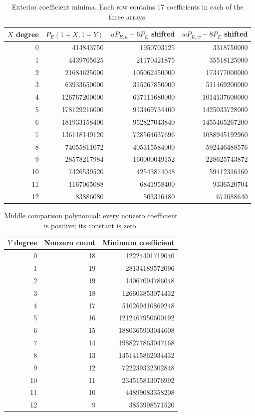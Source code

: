\begin{table}[htbp]
\centering\scriptsize
\caption{Exterior coefficient minima. Each row contains 17 coefficients in each of the three arrays.}\label{tab:E}
\begin{tabular}{r r r r}
\toprule
$X$ degree & $P_E(1+X,1+Y)$ & $uP_{E,u}-6P_E$ shifted & $wP_{E,w}-8P_E$ shifted\\
\midrule
0 & 414843750 & 1950703125 & 3318750000\\
1 & 4439765625 & 21170421875 & 35518125000\\
2 & 21684625000 & 105062450000 & 173477000000\\
3 & 63933650000 & 315267850000 & 511469200000\\
4 & 126767200000 & 637111680000 & 1014137600000\\
5 & 178129216000 & 913469734400 & 1425033728000\\
6 & 181933158400 & 952827043840 & 1455465267200\\
7 & 136118149120 & 728564637696 & 1088945192960\\
8 & 74055811072 & 405315584000 & 592446488576\\
9 & 28578217984 & 160000049152 & 228625743872\\
10 & 7426539520 & 42543874048 & 59412316160\\
11 & 1167065088 & 6841958400 & 9336520704\\
12 & 83886080 & 503316480 & 671088640\\
\bottomrule
\end{tabular}
\end{table}
\begin{table}[htbp]
\centering\small
\caption{Middle comparison polynomial: every nonzero coefficient is positive; its constant is zero.}\label{tab:M}
\begin{tabular}{r r r}
\toprule
$Y$ degree & Nonzero count & Minimum coefficient\\
\midrule
0 & 18 & 12224401719040\\
1 & 19 & 28134189572096\\
2 & 19 & 14067094786048\\
3 & 18 & 126603853074432\\
4 & 17 & 510269410869248\\
5 & 16 & 1212467950600192\\
6 & 15 & 1880365903044608\\
7 & 14 & 1988277863047168\\
8 & 13 & 1451415862034432\\
9 & 12 & 722239332302848\\
10 & 11 & 234515813076992\\
11 & 10 & 44899083358208\\
12 & 9 & 3853998571520\\
\bottomrule
\end{tabular}
\end{table}
